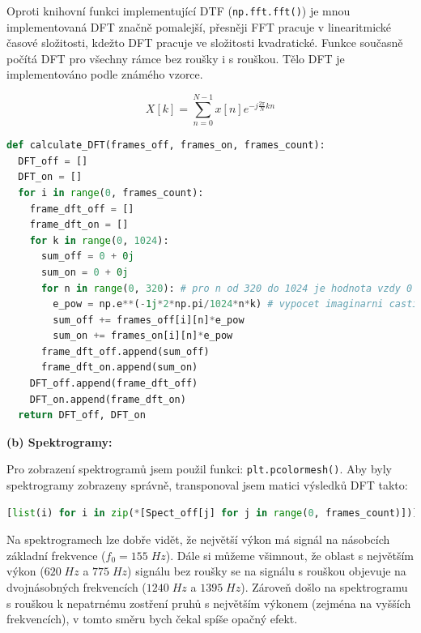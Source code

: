 \documentclass[12pt]{article}
\begin{document}
\hspace{1.5em}Oproti knihovní funkci implementující DTF (\texttt{np.fft.fft()}) je mnou implementovaná DFT značně pomalejší, přesněji FFT pracuje v linearitmické časové složitosti, kdežto DFT pracuje ve složitosti kvadratické. Funkce současně počítá DFT pro všechny rámce bez roušky i s rouškou. Tělo DFT je implementováno podle známého vzorce.
\begin{center}
\vspace{-2em}
\[ X[k] = \sum_{n=0}^{N-1} x[n]e^{-j\frac{2\pi}{N}kn} \]
\vspace{-2em}
\end{center}
\begin{lstlisting}[language=Python]
def calculate_DFT(frames_off, frames_on, frames_count):
  DFT_off = []
  DFT_on = []
  for i in range(0, frames_count):
    frame_dft_off = []
    frame_dft_on = []
    for k in range(0, 1024):
      sum_off = 0 + 0j
      sum_on = 0 + 0j
      for n in range(0, 320): # pro n od 320 do 1024 je hodnota vzdy 0
        e_pow = np.e**(-1j*2*np.pi/1024*n*k) # vypocet imaginarni casti
        sum_off += frames_off[i][n]*e_pow
        sum_on += frames_on[i][n]*e_pow
      frame_dft_off.append(sum_off)
      frame_dft_on.append(sum_on)
    DFT_off.append(frame_dft_off)
    DFT_on.append(frame_dft_on)
  return DFT_off, DFT_on
\end{lstlisting}
\newpage
\textbf{(b) Spektrogramy:}

Pro zobrazení spektrogramů jsem použil funkci: \texttt{plt.pcolormesh()}. Aby byly spektrogramy zobrazeny správně, transponoval jsem matici výsledků DFT takto: \begin{lstlisting}[language=Python] 
[list(i) for i in zip(*[Spect_off[j] for j in range(0, frames_count)])]
\end{lstlisting}
Na spektrogramech lze dobře vidět, že největší výkon má signál na násobcích základní frekvence ($f_0 = 155\;Hz$). Dále si můžeme všimnout, že oblast s největším výkon ($620\;Hz$ a $775\; Hz$) signálu bez roušky se na signálu s rouškou objevuje na dvojnásobných frekvencích ($1240\;Hz$ a $1395\; Hz$). Zároveň došlo na spektrogramu s rouškou k nepatrnému zostření pruhů s největším výkonem (zejména na vyšších frekvencích), v tomto směru bych čekal spíše opačný efekt.
\end{document}
